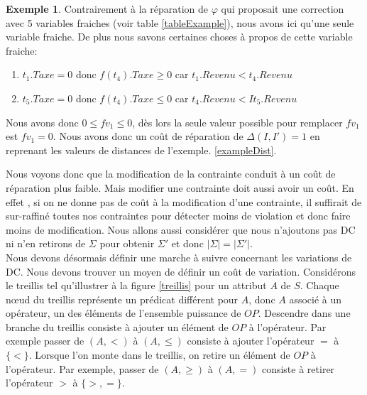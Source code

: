 \documentclass[letterpaper, 12pt]{report}
\theoremstyle{definition}
\newtheorem{myexample}{Exemple}
\begin{document}
\begin{myexample}
Contrairement à la réparation de $\varphi$ qui proposait une correction avec 5 variables fraiches (voir table \ref{tableExample}), nous avons ici qu'une seule variable fraiche. De plus nous savons certaines choses à propos de cette variable fraiche:

\begin{enumerate}

\item $t_1.Taxe=0$ donc $f(t_4).Taxe \geq 0$ car $t_1.Revenu < t_4.Revenu$
\item $t_5.Taxe=0$ donc $f(t_4).Taxe \leq 0$ car $t_4.Revenu < It_5.Revenu$

\end{enumerate}

Nous avons donc $0 \leq fv_1 \leq 0$, dès lors la seule valeur possible pour remplacer $fv_1$ est $fv_1 = 0$. Nous avons donc un coût de réparation de $\Delta(I,I') = 1$ en reprenant les valeurs de distances de l'exemple. \ref{exampleDist}.

\end{myexample}

Nous voyons donc que la modification de la contrainte conduit à un coût de réparation plus faible. Mais modifier une contrainte doit aussi avoir un coût. En effet , si on ne donne pas de coût à la modification d'une contrainte, il suffirait de sur-raffiné toutes nos contraintes pour détecter moins de violation et donc faire moins de modification. Nous allons aussi considérer que nous n'ajoutons pas DC ni n'en retirons de $\Sigma$ pour obtenir $\Sigma'$ et donc $|\Sigma| = |\Sigma'|$.\\

Nous devons désormais définir une marche à suivre concernant les variations de DC. Nous devons trouver un moyen de définir un coût de variation. Considérons le treillis tel qu'illustrer à la figure \ref{treillis} pour un attribut $A$ de $S$. Chaque nœud du treillis représente un prédicat différent pour $A$, donc $A$ associé à un opérateur, un des éléments de l'ensemble puissance de $OP$. Descendre dans une branche du treillis consiste à ajouter un élément de $OP$ à l'opérateur. Par exemple passer de $(A,<)$ à $(A,\leq)$ consiste à ajouter l'opérateur $=$ à $\{ < \}$. Lorsque l'on monte dans le treillis, on retire un élément de $OP$ à l'opérateur. Par exemple, passer de $(A, \geq)$ à $(A,=)$ consiste à retirer l'opérateur $>$ à $\{ >,= \}$.\\
\end{document}
